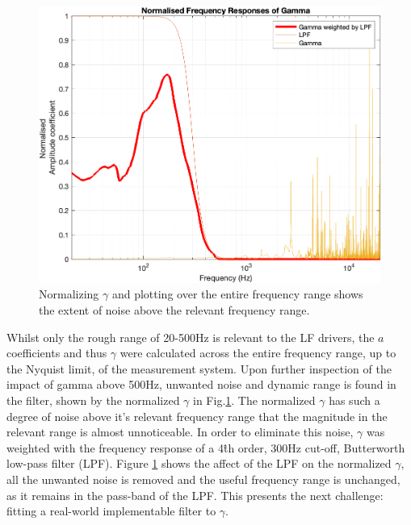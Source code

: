 \documentclass{report}
\begin{document}
            \begin{figure}[H]
                \centering
                \includegraphics[scale=0.35]{figs/gammaCompare.png}%
                \caption{Normalizing $\gamma$ and plotting over the entire frequency range shows the extent of noise above the relevant frequency range.}
                \label{gammaCompare}
            \end{figure}
            Whilst only the rough range of 20-500Hz is relevant to the LF drivers, the $a$ coefficients and thus $\gamma$ were calculated across the entire frequency range, up to the Nyquist limit, of the measurement system.
            Upon further inspection of the impact of gamma above 500Hz, unwanted noise and dynamic range is found in the filter, shown by the normalized $\gamma$ in Fig.\ref{gammaCompare}.
            The normalized $\gamma$ has such a degree of noise above it's relevant frequency range that the magnitude in the relevant range is almost unnoticeable.
            In order to eliminate this noise, $\gamma$ was weighted with the frequency response of a 4\^{th} order, 300Hz cut-off, Butterworth low-pass filter (LPF).
            Figure \ref{gammaCompare} shows the affect of the LPF on the normalized $\gamma$, all the unwanted noise is removed and the useful frequency range is unchanged, as it remains in the pass-band of the LPF.
            This presents the next challenge: fitting a real-world implementable filter to $\gamma$.
\end{document}
